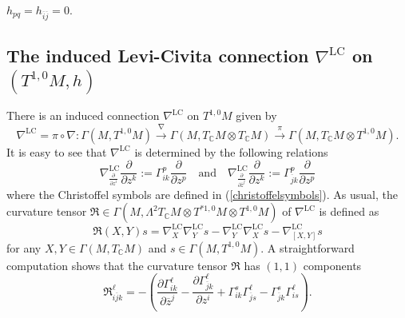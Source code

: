 \documentclass[12pt]{amsart}
\theoremstyle{plain}
\theoremstyle{definition}
\newcommand{\p}{\partial}
\renewcommand{\bar}{\overline}
\newcommand{\beq}{\begin{equation}}
\newcommand{\eeq}{\end{equation}}
\newcommand{\qtq}[1]{\quad\mbox{#1}\quad}
\newcommand{\ts}{\otimes}
\renewcommand{\>}{\rightarrow}
\newcommand{\C}{{\mathbb C}}
\numberwithin{equation}{section} %
\begin{document}
	$h_{pq}=h_{\bar i\bar j}=0$.
	
	
	
	
	
	\baselineskip 	
	
	
	\subsection{The induced Levi-Civita connection $\nabla^{\mathrm{LC}}$ on $(T^{1,0}M,h)$}  
	There is an induced connection
	$\nabla^{\mathrm{LC}}$ on  $T^{1,0}M$
	given by \beq \nabla^{\text{LC}}=\pi\circ\nabla:
	\Gamma(M,T^{1,0}M)\stackrel{\nabla}{\rightarrow}\Gamma(M, T_{\C}M\ts
	T_{\C}M)\stackrel{\pi}{\rightarrow}\Gamma(M,T_{\C}M\ts T^{1,0}M).
	\eeq  It is easy to see that
	 $\nabla^{\text{LC}}$ is
	determined by the following relations \beq
	\nabla^{\text{LC}}_{\frac{\p}{\p z^i}}\frac{\p}{\p
		z^k}:=\Gamma_{ik}^p\frac{\p}{\p z^p} \qtq{and}
	\nabla^{\mathrm{LC}}_{\frac{\p}{\p \bar z^j}}\frac{\p}{\p
		z^k}:=\Gamma_{\bar jk}^p\frac{\p}{\p z^p} \eeq where the Christoffel symbols are defined in (\ref{christoffelsymbols}). As usual, the curvature  tensor $\mathfrak{R}\in
	\Gamma(M,\Lambda^2 T_{\C}M\ts T^{*1,0}M\ts T^{1,0}M)$ of
	$\nabla^{\mathrm{LC}}$ is defined as \beq  \mathfrak{R}(X,Y)s
	=\nabla^{\mathrm{LC}}_{X}\nabla^{\mathrm{LC}}_Ys-\nabla^{\mathrm{LC}}_Y\nabla^{\mathrm{LC}}_Xs-\nabla^{\mathrm{LC}}_{[X,Y]}s \label{curvaturedefinition} \eeq
	for any $X,Y\in \Gamma(M,T_{\C}M)$ and $s\in \Gamma(M, T^{1,0}M)$. A straightforward
	computation shows that the curvature tensor $\mathfrak{R}$ has
	$(1,1)$ components \beq \mathfrak{R}_{i\bar
		jk}^{\ell}=-\left(\frac{\p \Gamma^{\ell}_{ik}}{\p \bar z^j}-\frac{\p
		\Gamma^{\ell}_{\bar jk}}{\p z^i}+\Gamma_{ ik}^{s}\Gamma^{\ell}_{\bar
		js}-\Gamma_{ \bar jk}^{s}\Gamma^{\ell}_{is }\right).\label{levicivitacurvatureformula}\eeq
	
\end{document}
